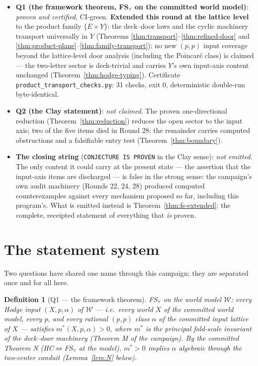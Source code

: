 \documentclass[11pt]{article}
\newtheorem{definition}[theorem]{Definition}
\begin{document}
\begin{itemize}
\item \textbf{Q1 (the framework theorem, FS$_\forall$ on the committed world
model)}: \emph{proven and certified}, CI-green. \textbf{Extended this round
at the lattice level} to the product family $\{E\times Y\}$: the deck--door
laws and the cyclic machinery transport universally in $Y$ (Theorems
\ref{thm:transport}--\ref{thm:refined-door} and
\ref{thm:product-plane}--\ref{thm:family-transport}); no new $(p,p)$ input
coverage beyond the lattice-level door analysis (including the Poincaré
class) is claimed --- the two-letter sector is deck-trivial and carries
$Y$'s own input-axis content unchanged (Theorem~\ref{thm:hodge-typing}).
Certificate \texttt{product\_transport\_checks.py}: 31 checks, exit 0,
deterministic double-run byte-identical.
\item \textbf{Q2 (the Clay statement)}: \emph{not claimed}. The proven
one-directional reduction (Theorem~\ref{thm:reduction}) reduces the open
sector to the input axis; two of the five items died in Round 28; the
remainder carries computed obstructions and a falsifiable entry test
(Theorem~\ref{thm:boundary}).
\item \textbf{The closing string} (\texttt{CONJECTURE IS PROVEN} in the Clay
sense): \emph{not emitted}. The only content it could carry at the present
state --- the assertion that the input-axis items are discharged --- is
false in the strong sense: the campaign's own audit machinery (Rounds 22,
24, 28) produced computed counterexamples against every mechanism proposed
so far, including this program's. What is emitted instead is
Theorem~\ref{thm:fs-extended}: the complete, receipted statement of
everything that \emph{is} proven.
\end{itemize}

\section{The statement system}\label{sec:statements}

Two questions have shared one name through this campaign; they are
separated once and for all here.

\begin{definition}[Q1 --- the framework theorem]
\emph{FS$_\forall$ on the world model $\mathcal W$}: every Hodge input
$(X,p,\alpha)$ of $\mathcal W$ --- i.e.\ every world $X$ of the committed
world model, every $p$, and every rational $(p,p)$ class $\alpha$ of the
committed input lattice of $X$ --- satisfies $m^\ast(X,p,\alpha)>0$, where
$m^\ast$ is the principal fold-scale invariant of the deck--door machinery
(Theorem M of the campaign). By the committed Theorem N
(HC$\iff$FS$_\forall$ at the model), $m^\ast>0$ implies $\alpha$ algebraic
through the two-center conduit (Lemma~\ref{lem:N} below).
\end{definition}
\end{document}
